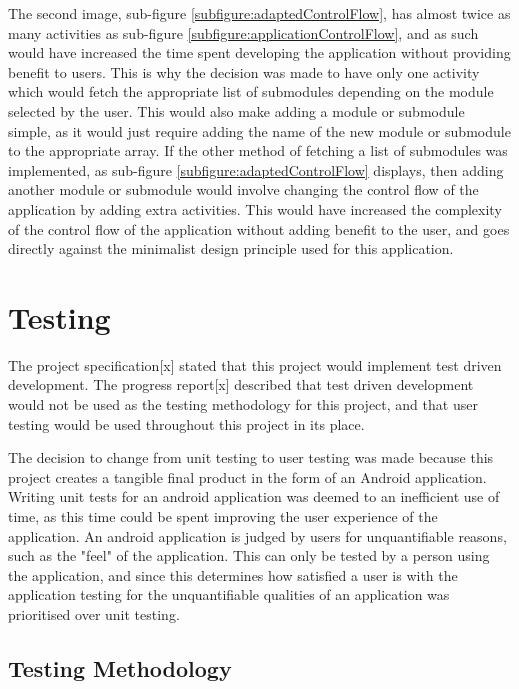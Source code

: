 \documentclass{article}
\begin{document}
The second image, sub-figure \ref{subfigure:adaptedControlFlow}, has almost twice as many activities as sub-figure \ref{subfigure:applicationControlFlow}, and as such would have increased the time spent developing the application without providing benefit to users. This is why the decision was made to have only one activity which would fetch the appropriate list of submodules depending on the module selected by the user. This would also make adding a module or submodule simple, as it would just require adding the name of the new module or submodule to the appropriate array. If the other method of fetching a list of submodules was implemented, as sub-figure \ref{subfigure:adaptedControlFlow} displays, then adding another module or submodule would involve changing the control flow of the application by adding extra activities. This would have increased the complexity of the control flow of the application without adding benefit to the user, and goes directly against the minimalist design principle used for this application. 


\section{Testing}
\label{section:testing}

The project specification[x] stated that this project would implement test driven development. The progress report[x] described that test driven development would not be used as the testing methodology for this project, and that user testing would be used throughout this project in its place. \par

The decision to change from unit testing to user testing was made because this project creates a tangible final product in the form of an Android application. Writing unit tests for an android application was deemed to an inefficient use of time, as this time could be spent improving the user experience of the application. An android application is judged by users for unquantifiable reasons, such as the "feel" of the application. This can only be tested by a person using the application, and since this determines how satisfied a user is with the application testing for the unquantifiable qualities of an application was prioritised over unit testing. \par

\subsection{Testing Methodology}
\end{document}
